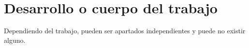 \chapter{Desarrollo o cuerpo del trabajo}

Dependiendo del trabajo, pueden ser apartados independientes y puede no existir alguno.